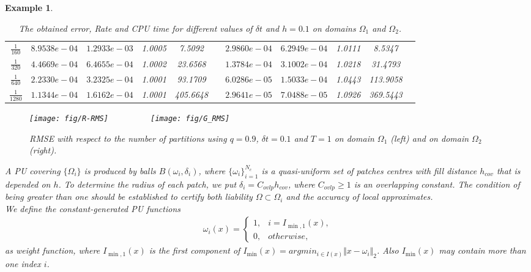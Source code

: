 \documentclass[9pt]{article}
\newtheorem{example}[theorem]{Example}
\numberwithin{equation}{section}
\begin{document}
\begin{example}
\begin{table}[!h]
\begin{tabular}{ c | c c c c c c c c c c}
{$\frac{1}{160}$} & {$8.9538e-04$} & {$1.2933e-03$} & {1.0005}  & {7.5092}&& {$2.9860e-04$} & {$6.2949e-04$} & {1.0111}  & {8.5347}\\ 
{$\frac{1}{320}$} & {$4.4669e-04$} & {$6.4655e-04$} & {1.0002}  & {23.6568}&& {$1.3784e-04$} & {$3.1002e-04$} & {1.0218}  & {31.4793}\\ 
{$\frac{1}{640}$} & {$2.2330e-04$} & {$3.2325e-04$} & {1.0001}  & {93.1709}&& {$6.0286e-05$} & {$1.5033e-04$} & {1.0443}  & {113.9058} \\ 
{$\frac{1}{1280}$} & {$1.1344e-04$} & {$1.6162e-04$} & {1.0001}  & {405.6648}&& {$2.9641e-05$} & {$7.0488e-05$} & {1.0926}  & {369.5443}\\ 
\hline
\end{tabular}
\caption{The obtained error, Rate and CPU time for different values of $\delta t$ and $h=0.1$ on domains $\Omega_1$ and $\Omega_2$.}
\label{table1}
\end{table}
\begin{figure}[!h]
\centering
\texttt{[image: fig/R-RMS]}~~~~~~~~~
\texttt{[image: fig/G\_RMS]}
\caption{RMSE with respect to the number of partitions using $q = 0.9$, $\delta t = 0.1$ and $T=1$ on domain $\Omega_1$ (left) and on domain $\Omega_2$ (right).}
\label{fig_con}
\end{figure}
A PU covering $\lbrace \Omega _{i} \rbrace$ is produced by balls $B(\omega _{i},\delta _{i})$, where $\lbrace \omega _{i}\rbrace _{i=1}^{N_c}$ is a quasi-uniform set of patches centres with fill distance $h_{cov}$ that is depended on $h$. To determine the radius of each patch, we put $\delta _{i}=C_{ovlp}h_{cov}$, where $C_{ovlp}\geq 1$ is an overlapping constant. The condition of being greater than one should be established to certify both liability $\Omega \subset \Omega _{i}$ and the accuracy of local approximates.\\
We define the constant-generated PU functions
\begin{align*}
\omega _{i}(x)=\left\{
                 \begin{array}{ll}
                   1, & i=I_{\min,1}(x), \\
                   0, & otherwise,
                 \end{array}
               \right.
\end{align*}
as weight function, where $I_{\min,1}(x)$ is the first component of $I_{\min}(x)=argmin_{i\in I(x)}\Vert x-\omega _{i}\Vert_{2}$. Also $I_{\min}(x)$ may contain more than one index $i$.\\

\end{example}
\end{document}
